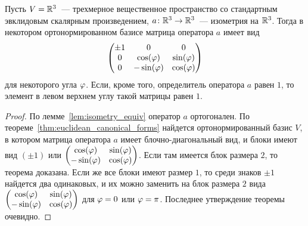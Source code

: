 \begin{corollary}
Пусть $V = \mathbb R^3$~--- трехмерное вещественное пространство со
стандартным эвклидовым скалярным произведением, $a\colon\mathbb
R^3\to\mathbb R^3$~--- изометрия на $\mathbb R^3$. Тогда в некотором
ортонормированном базисе матрица оператора $a$ имеет вид
$$
\begin{pmatrix}
\pm 1 & 0 & 0\\
0 & \cos(\varphi) & \sin(\varphi)\\
0 & -\sin(\varphi) & \cos(\varphi)
\end{pmatrix}
$$
для некоторого угла $\varphi$.
Если, кроме того, определитель оператора $a$ равен $1$, то элемент в
левом верхнем углу такой матрицы равен $1$.
\end{corollary}
\begin{proof}
По лемме~\ref{lem:isometry_equiv} оператор $a$ ортогонален. По
теореме~\ref{thm:euclidean_canonical_forms} найдется ортонормированный
базис $V$, в котором матрица оператора $a$ имеет блочно-диагональный
вид, и блоки имеют вид $(\pm 1)$ или
$\begin{pmatrix}\cos(\varphi)&\sin(\varphi)\\-\sin(\varphi)&\cos(\varphi)\end{pmatrix}$. Если
там имеется блок размера $2$, то теорема доказана. Если же все блоки
имеют размер $1$, то среди знаков $\pm 1$ найдется два одинаковых, и
их можно заменить на блок размера $2$ вида
$\begin{pmatrix}\cos(\varphi)&\sin(\varphi)\\-\sin(\varphi)&\cos(\varphi)\end{pmatrix}$
для $\varphi=0$ или $\varphi = \pi$. Последнее утверждение теоремы очевидно.
\end{proof}

